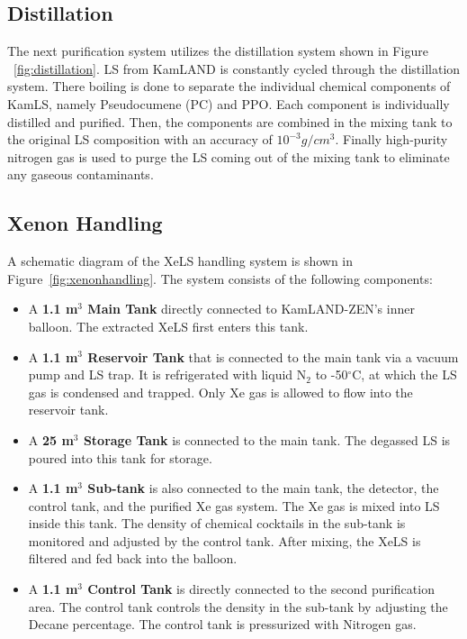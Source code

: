 \subsection{Distillation}
The next purification system utilizes the distillation system shown in Figure ~\ref{fig:distillation}. LS from KamLAND is constantly cycled through the distillation system. There boiling is done to separate the individual chemical components of KamLS, namely Pseudocumene (PC) and PPO. Each component is individually distilled and purified. Then, the components are combined in the mixing tank to the original LS composition with an accuracy of $10^{-3}g/cm^3$. Finally high-purity nitrogen gas is used to purge the LS coming out of the mixing tank to eliminate any gaseous contaminants.

\subsection{Xenon Handling}
A schematic diagram of the XeLS handling system is shown in Figure~\ref{fig:xenonhandling}. The system consists of the following components:
\begin{itemize}
	\item A \textbf{1.1 m$^3$ Main Tank} directly connected to KamLAND-ZEN's inner balloon. The extracted XeLS first enters this tank.
	\item A \textbf{1.1 m$^3$ Reservoir Tank} that is connected to the main tank via a vacuum pump and LS trap. It is refrigerated with liquid N$_2$ to -50$^\circ$C, at which the LS gas is condensed and trapped. Only Xe gas is allowed to flow into the reservoir tank.
	\item A \textbf{25 m$^3$ Storage Tank} is connected to the main tank. The degassed LS is poured into this tank for storage.
	\item A \textbf{1.1 m$^3$ Sub-tank} is also connected to the main tank, the detector, the control tank, and the purified Xe gas system. The Xe gas is mixed into LS inside this tank. The density of chemical cocktails in the sub-tank is monitored and adjusted by the control tank. After mixing, the XeLS is filtered and fed back into the balloon.
	\item A \textbf{1.1 m$^3$ Control Tank} is directly connected to the second purification area. The control tank controls the density in the sub-tank by adjusting the Decane percentage. The control tank is pressurized with Nitrogen gas. 
\end{itemize}


